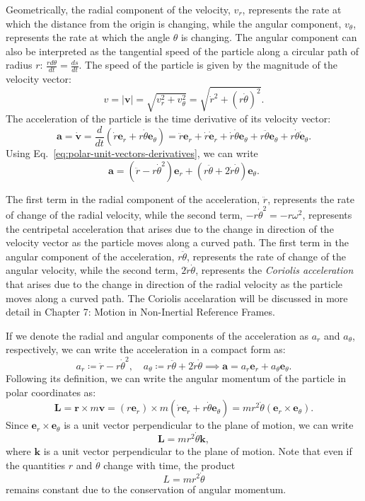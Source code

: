 \documentclass[12pt]{article}
\begin{document}
Geometrically, the radial component of the velocity, $v_r$, represents the rate at which the distance from the origin is changing, while the angular component, $v_\theta$, represents the rate at which the angle $\theta$ is changing. The angular component can also be interpreted as the tangential speed of the particle along a circular path of radius $r$: $\frac{rd\theta}{dt}= \frac{ds}{dt}$. The speed of the particle is given by the magnitude of the velocity vector:
\[
v = |\mathbf{v}| = \sqrt{v_r^2 + v_\theta^2} = \sqrt{\dot{r}^2 + (r\dot{\theta})^2}.
\]
The acceleration of the particle is the time derivative of its velocity vector:
\[
\mathbf{a} = \dot{\mathbf{v}} = \frac{d}{dt}(\dot{r}\mathbf{e}_r + r\dot{\theta}\mathbf{e}_\theta) = \ddot{r}\mathbf{e}_r + \dot{r}\dot{\mathbf{e}}_r + \dot{r}\dot{\theta}\mathbf{e}_\theta + r\ddot{\theta}\mathbf{e}_\theta + r\dot{\theta}\dot{\mathbf{e}}_\theta.
\]
Using Eq.~\ref{eq:polar-unit-vectors-derivatives}, we can write
\begin{equation}
\mathbf{a} = (\ddot{r} - r\dot{\theta}^2)\mathbf{e}_r + (r\ddot{\theta} + 2\dot{r}\dot{\theta})\mathbf{e}_\theta.
\label{eq:polar-acceleration}
\end{equation}

The first term in the radial component of the acceleration, $\ddot{r}$, represents the rate of change of the radial velocity, while the second term, $-r\dot{\theta}^2=-r\omega^2$, represents the centripetal acceleration that arises due to the change in direction of the velocity vector as the particle moves along a curved path. The first term in the angular component of the acceleration, $r\ddot{\theta}$, represents the rate of change of the angular velocity, while the second term, $2\dot{r}\dot{\theta}$, represents the \emph{Coriolis acceleration} that arises due to the change in direction of the radial velocity as the particle moves along a curved path. The Coriolis accelaration will be discussed in more detail in Chapter 7: Motion in Non-Inertial Reference Frames.

If we denote the radial and angular components of the acceleration as $a_r$ and $a_\theta$, respectively, we can write the acceleration in a compact form as:
\[
a_r \coloneqq \ddot{r} - r\dot{\theta}^2, \quad a_\theta \coloneqq r\ddot{\theta} + 2\dot{r}\dot{\theta} \implies \mathbf{a} = a_r \mathbf{e}_r + a_\theta \mathbf{e}_\theta.
\]
Following its definition, we can write the angular momentum of the particle in polar coordinates as:
\[
\mathbf{L} = \mathbf{r} \times m\mathbf{v}
= (r\mathbf{e}_r) \times m(\dot{r}\mathbf{e}_r + r\dot{\theta}\mathbf{e}_\theta)
= mr^2\dot{\theta}(\mathbf{e}_r \times \mathbf{e}_\theta).
\]
Since $\mathbf{e}_r \times \mathbf{e}_\theta$ is a unit vector perpendicular to the plane of motion, we can write
\[
\mathbf{L} = mr^2\dot{\theta}\mathbf{k},
\]
where $\mathbf{k}$ is a unit vector perpendicular to the plane of motion. Note that even if the quantities $r$ and $\dot{\theta}$ change with time, the product
\begin{equation}
L = mr^2\dot{\theta} 
\label{eq:angular-momentum-polar}
\end{equation}
remains constant due to the conservation of angular momentum.
\end{document}
